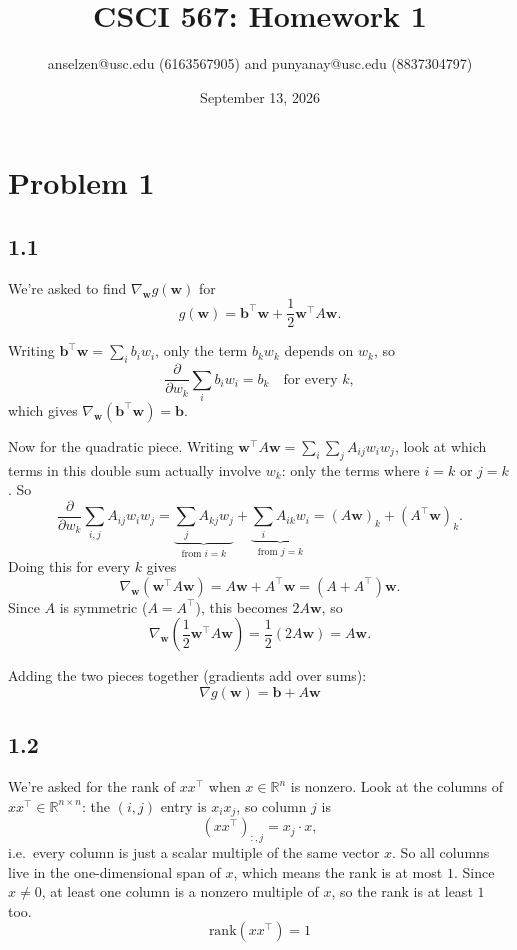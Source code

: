 \documentclass{article}
\title{CSCI 567: Homework 1}
\author{anselzen@usc.edu (6163567905) and punyanay@usc.edu (8837304797)}
\date{September 13, 2026}
\begin{document}
\maketitle

\section*{Problem 1}

\subsection*{1.1}

We're asked to find $\nabla_{\mathbf{w}} g(\mathbf{w})$ for
\[
g(\mathbf{w}) = \mathbf{b}^\top \mathbf{w} + \frac{1}{2}\mathbf{w}^\top A \mathbf{w}.
\]

Writing $\mathbf{b}^\top \mathbf{w} = \sum_i b_i w_i$, only the term $b_k w_k$ depends on $w_k$, so
\[
\frac{\partial}{\partial w_k}\sum_i b_i w_i = b_k \quad \text{for every } k,
\]
which gives $\nabla_{\mathbf{w}}(\mathbf{b}^\top \mathbf{w}) = \mathbf{b}$.

\medskip
\noindent
Now for the quadratic piece. Writing $\mathbf{w}^\top A \mathbf{w} = \sum_i \sum_j A_{ij} w_i w_j$,
look at which terms in this double sum actually involve $w_k$: only the terms where $i=k$
or $j=k$. So
\[
\frac{\partial}{\partial w_k}\sum_{i,j} A_{ij} w_i w_j
= \underbrace{\sum_j A_{kj} w_j}_{\text{from } i=k} + \underbrace{\sum_i A_{ik} w_i}_{\text{from } j=k}
= (A\mathbf{w})_k + (A^\top \mathbf{w})_k.
\]
Doing this for every $k$ gives
\[
\nabla_{\mathbf{w}}(\mathbf{w}^\top A \mathbf{w}) = A\mathbf{w} + A^\top\mathbf{w} = (A+A^\top)\mathbf{w}.
\]
Since $A$ is symmetric ($A=A^\top$), this becomes $2A\mathbf{w}$, so
\[
\nabla_{\mathbf{w}}\left(\frac{1}{2}\mathbf{w}^\top A \mathbf{w}\right) = \frac{1}{2}(2A\mathbf{w}) = A\mathbf{w}.
\]

\medskip
\noindent
Adding the two pieces together (gradients add over sums):
\[
\boxed{\nabla g(\mathbf{w}) = \mathbf{b} + A\mathbf{w}}
\]

\subsection*{1.2}

We're asked for the rank of $xx^\top$ when $x \in \mathbb{R}^n$ is nonzero. Look at the columns of $xx^\top \in \mathbb{R}^{n\times n}$: the $(i,j)$ entry is $x_i x_j$, so column $j$ is
\[
(xx^\top)_{:,j} = x_j \cdot x,
\]
i.e.\ every column is just a scalar multiple of the same vector $x$. So all columns live in the one-dimensional span of $x$, which means the rank is at most $1$. Since $x \neq 0$, at least one column is a nonzero multiple of $x$, so the rank is at least $1$ too.
\[
\boxed{\text{rank}(xx^\top) = 1}
\]
\end{document}
